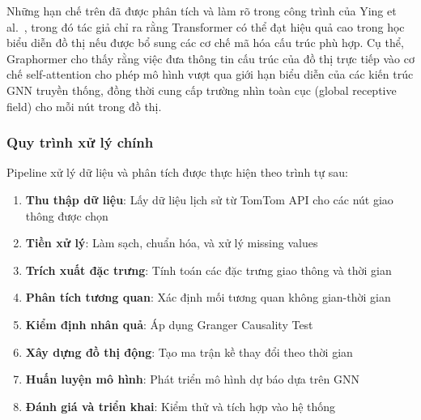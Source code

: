 Những hạn chế trên đã được phân tích và làm rõ trong công trình của Ying et al.~\cite{ying2021graphormer},
trong đó tác giả chỉ ra rằng Transformer có thể đạt hiệu quả cao trong học biểu diễn đồ thị nếu được bổ sung các cơ chế mã hóa cấu trúc phù hợp. Cụ thể, Graphormer cho thấy rằng việc đưa thông tin
cấu trúc của đồ thị trực tiếp vào cơ chế self-attention cho phép mô hình vượt qua giới hạn biểu diễn
của các kiến trúc GNN truyền thống, đồng thời cung cấp trường nhìn toàn cục (global receptive field)
cho mỗi nút trong đồ thị.

\subsubsection{Quy trình xử lý chính}

Pipeline xử lý dữ liệu và phân tích được thực hiện theo trình tự sau:

\begin{enumerate}
    \item \textbf{Thu thập dữ liệu}: Lấy dữ liệu lịch sử từ TomTom API cho các nút giao thông được chọn
    \item \textbf{Tiền xử lý}: Làm sạch, chuẩn hóa, và xử lý missing values
    \item \textbf{Trích xuất đặc trưng}: Tính toán các đặc trưng giao thông và thời gian
    \item \textbf{Phân tích tương quan}: Xác định mối tương quan không gian-thời gian
    \item \textbf{Kiểm định nhân quả}: Áp dụng Granger Causality Test
    \item \textbf{Xây dựng đồ thị động}: Tạo ma trận kề thay đổi theo thời gian
    \item \textbf{Huấn luyện mô hình}: Phát triển mô hình dự báo dựa trên GNN
    \item \textbf{Đánh giá và triển khai}: Kiểm thử và tích hợp vào hệ thống
\end{enumerate}

\newpage
